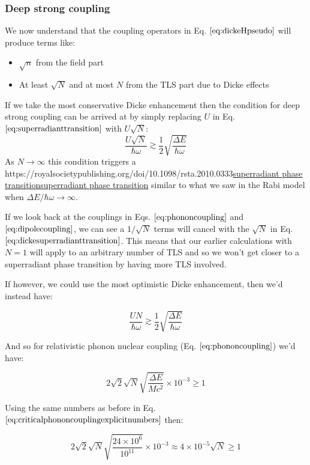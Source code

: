 \documentclass[
]{article}
\let\oldhref\href
\renewcommand{\href}[2]{\ifx#1\urlprefix\oldhref{#1}{#2}\else\uline{\oldhref{#1}{#2}}\fi}
\renewcommand{\[}{\begin{equation}}
\renewcommand{\]}{\end{equation}}
\providecommand{\tightlist}{%
  \setlength{\itemsep}{0pt}\setlength{\parskip}{0pt}}
\begin{document}
\subsubsection{Deep strong coupling}\label{deep-strong-coupling-2}

We now understand that the coupling operators in Eq.
\(\ref{eq:dickeHpseudo}\) will produce terms like:

\begin{itemize}
\tightlist
\item
  \(\sqrt{n}\) from the field part
\item
  At least \(\sqrt{N}\) and at most \(N\) from the TLS part due to Dicke
  effects
\end{itemize}

If we take the most conservative Dicke enhancement then the condition
for deep strong coupling can be arrived at by simply replacing \(U\) in
Eq. \(\ref{eq:superradianttransition}\) with \(U\sqrt{N{}}\): \[
\frac{U\sqrt{N}}{\hbar\omega} \gtrsim \frac{1}{2}\sqrt{\frac{\Delta E}{\hbar\omega}}
\label{eq:dickesuperradianttransition}
\] As \(N\rightarrow \infty\) this condition triggers a
\href{https://royalsocietypublishing.org/doi/10.1098/rsta.2010.0333}{superradiant
phase transition} similar to what we saw in the Rabi model when
\(\Delta E / \hbar\omega \rightarrow \infty\).

If we look back at the couplings in Eqs. \(\ref{eq:phononcoupling}\) and
\(\ref{eq:dipolecoupling}\), we can see a \(1/\sqrt{N}\) terms will
cancel with the \(\sqrt{N}\) in Eq.
\(\ref{eq:dickesuperradianttransition}\). This means that our earlier
calculations with \(N=1\) will apply to an arbitrary number of TLS and
so we won't get closer to a superradiant phase transition by having more
TLS involved.

If however, we could use the most optimistic Dicke enhancement, then
we'd instead have:

\[
\frac{UN}{\hbar\omega} \gtrsim \frac{1}{2}\sqrt{\frac{\Delta E}{\hbar\omega}}
\label{eq:dickesuperradianttransition2}
\]

And so for relativistic phonon nuclear coupling (Eq.
\(\ref{eq:phononcoupling}\)) we'd have:

\[
2\sqrt{2}\sqrt{N} \sqrt{\frac{\Delta E}{M c^2}}  \times 10^{-3} \ge 1
\]

Using the same numbers as before in Eq.
\(\ref{eq:criticalphononcouplingexplicitnumbers}\) then:

\[
2\sqrt{2} \sqrt{N}\sqrt{\frac{24\times10^6}{10^{11}}}  \times 10^{-3} \approx 4 \times 10^{-5} \sqrt{N} \ge 1
\]
\end{document}
